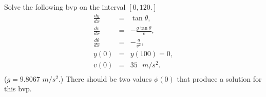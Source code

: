 \begin{problem}
Solve the following bvp on the interval $[0,120.]$
\begin{eqnarray*}
\frac{dy}{dx} &=& \tan {\theta} ,\\
\frac{dv}{dx} &=& -\frac{g \tan{\theta}}{v } ,\\
\frac{d\theta}{dx} &=& -\frac{g}{v^2},\\
y(0)&=& y(100) = 0,\\
v(0) &=& 35 \text{ }m/s^2.\\
\end{eqnarray*}
($g = 9.8067$ $m/s^2.$) There should be two values $\phi(0)$ that produce a solution 
for this bvp.
\end{problem}






